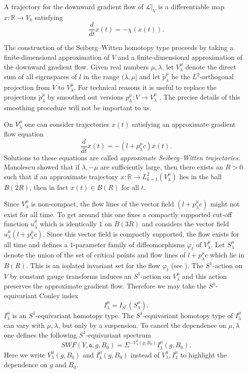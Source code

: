 \documentclass{amsart}
\theoremstyle{definition}
\theoremstyle{remark}
\numberwithin{equation}{section}
\begin{document}
A trajectory for the downward gradient flow of $\mathcal{L}|_V$ is a differentiable map $x : \mathbb{R} \to V_k$ satisfying
\[
\frac{d}{dt} x(t) = -\chi(x(t)).
\]

The construction of the Seiberg--Witten homotopy type proceeds by taking a finite-dimensional approximation of $V$ and a finite-dimensional approximation of the downward gradient flow. Given real numbers $\mu,\lambda$, let $V^\mu_\lambda$ denote the direct sum of all eigenspaces of $l$ in the range $(\lambda , \mu]$ and let $\widetilde{p}^\mu_\lambda$ be the $L^2$-orthogonal projection from $V$ to $V^\mu_\lambda$. For technical reasons it is useful to replace the projections $\widetilde{p}^\mu_\lambda$ by smoothed out versions $p^\mu_\lambda : V \to V^\mu_\lambda$ \cite[]{man}. The precise details of this smoothing procedure will not be important to us.

On $V^\mu_\lambda$ one can consider trajectories $x(t)$ satisfying an approximate gradient flow equation
\[
\frac{d}{dt} x(t) = -( l + p^\mu_\lambda c)x(t).
\]
Solutions to these equations are called {\em approximate Seiberg--Witten trajectories}. Manolescu showed that if $\lambda, -\mu$ are sufficiently large, then there exists an $R > 0$ such that if an approximate trajectory $x : \mathbb{R} \to L^2_{k+1}(V^\mu_\lambda)$ lies in the ball $\overline{B(2R)}$, then in fact $x(t) \in B(R)$ for all $t$.

Since $V^\mu_\lambda$ is non-compact, the flow lines of the vector field $(l+p^\mu_\lambda c)$ might not exist for all time. To get around this one fixes a compactly supported cut-off function $u^\mu_\lambda$ which is identically $1$ on $B(3R)$ and considers the vector field $u^\mu_\lambda( l + p^\mu_\lambda c)$. Since this vector field is compactly supported, the flow exists for all time and defines a $1$-parameter family of diffeomorphisms $\varphi_t$ of $V^\mu_\lambda$. Let $S^\mu_\lambda$ denote the union of the set of critical points and flow lines of $l + p^\mu_\lambda c$ which lie in $B(R)$. This is an isolated invariant set for the flow $\varphi_t$ (see \cite[]{man}). The $S^1$-action on $V$ by constant gauge transforms induces an $S^1$-action on $V^\mu_\lambda$ and this action preserves the approximate gradient flow. Therefore we may take the $S^1$-equivariant Conley index
\[
I^\mu_\lambda = I_{S^1}(S^\mu_\lambda).
\]
$I^\mu_\lambda$ is an $S^1$-equivariant homotopy type. The $S^1$-equivariant homotopy type of $I^\mu_\lambda$ can vary with $\mu,\lambda$, but only by a suspension. To cancel the dependence on $\mu,\lambda$ one defines the following $S^1$-equivariant spectrum
\[
SWF( Y , \mathfrak{s} , g , B_0) = \Sigma^{-V^0_\lambda(g,B_0)} I^\mu_\lambda(g,B_0).
\]
Here we write $V^0_\lambda(g,B_0)$ and $I^\mu_\lambda(g,B_0)$ instead of $V^0_\lambda, I^\mu_\lambda$ to highlight the dependence on $g$ and $B_0$.
\end{document}
